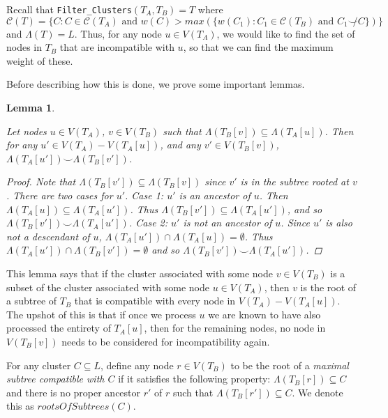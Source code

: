 \documentclass{article}
\newcommand{\compatible}{\smile}
\newcommand{\leafset}{\Lambda}
\newtheorem{filterclusterssubsetcompatible}[incompatibility]{Lemma}
\begin{document}
    Recall that \texttt{Filter\_Clusters}$(T_A, T_B) = T$ where $\mathcal{C}(T) = \{C : C \in \mathcal{C}(T_A) \text{ and } w(C) > max(\{w(C_1) : C_1 \in \mathcal{C}(T_B) \text{ and } C_1 \not\compatible C\})\}$ and $\leafset(T) = L$. Thus, for any node $u \in V(T_A)$, we would like to find the set of nodes in $T_B$ that are incompatible with $u$, so that we can find the maximum weight of these.

    Before describing how this is done, we prove some important lemmas.
    \newline

    \begin{filterclusterssubsetcompatible}
        \label{lem:filterclusterssubsetcompatible}

        Let nodes $u \in V(T_A)$, $v \in V(T_B)$ such that $\leafset(T_B[v]) \subseteq \leafset(T_A[u])$. Then for any $u' \in V(T_A) - V(T_A[u])$, and any $v' \in V(T_B[v])$, $\leafset(T_A[u']) \compatible \leafset(T_B[v'])$.

        \begin{proof}
            Note that $\leafset(T_B[v']) \subseteq \leafset(T_B[v])$ since $v'$ is in the subtree rooted at $v$. There are two cases for $u'$. \textit{Case 1}: $u'$ is an ancestor of $u$. Then $\leafset(T_A[u]) \subseteq \leafset(T_A[u'])$. Thus $\leafset(T_B[v']) \subseteq \leafset(T_A[u'])$, and so $\leafset(T_B[v']) \compatible \leafset(T_A[u'])$. \textit{Case 2}: $u'$ is not an ancestor of $u$. Since $u'$ is also not a descendant of $u$, $\leafset(T_A[u']) \cap \leafset(T_A[u]) = \emptyset$. Thus $\leafset(T_A[u']) \cap \leafset(T_B[v']) = \emptyset$ and so $\leafset(T_B[v']) \compatible \leafset(T_A[u'])$.
        \end{proof}
    \end{filterclusterssubsetcompatible}

    This lemma says that if the cluster associated with some node $v \in V(T_B)$ is a subset of the cluster associated with some node $u \in V(T_A)$, then $v$ is the root of a subtree of $T_B$ that is compatible with every node in $V(T_A) - V(T_A[u])$. The upshot of this is that if once we process $u$ we are known to have also processed the entirety of $T_A[u]$, then for the remaining nodes, no node in $V(T_B[v])$ needs to be considered for incompatibility again.

    For any cluster $C \subseteq L$, define any node $r \in V(T_B)$ to be the root of a \textit{maximal subtree compatible with $C$} if it satisfies the following property: $\leafset(T_B[r]) \subseteq C$ and there is no proper ancestor $r'$ of $r$ such that $\leafset(T_B[r']) \subseteq C$. We denote this as $rootsOfSubtrees(C)$.
\end{document}
